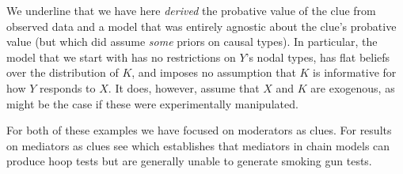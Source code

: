 \documentclass[
  12pt,
]{book}
\begin{document}
We underline that we have here \emph{derived} the probative value of the clue from observed data and a model that was entirely agnostic about the clue's probative value (but which did assume \emph{some} priors on causal types). In particular, the model that we start with has no restrictions on \(Y\)'s nodal types, has flat beliefs over the distribution of \(K\), and imposes no assumption that \(K\) is informative for how \(Y\) responds to \(X\). It does, however, assume that \(X\) and \(K\) are exogenous, as might be the case if these were experimentally manipulated.

\begin{table}

\caption{\label{tab:testsfinite}Classic tests with probative value inferred from (simulated) data, for query, Does $X$ have a positive effect on $Y$ in this case?}
\centering
{}
\end{table}

For both of these examples we have focused on moderators as clues. For results on mediators as clues see \citet{dawid2019bounding} which establishes that mediators in chain models can produce hoop tests but are generally unable to generate smoking gun tests.
\end{document}
